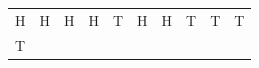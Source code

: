 {{\begin{center}
\begin{tabular}[t]{|l|l|l|l|l|l|l|l|l|l|}
     \tabularnewline\cline{1-1}\cline{2-2}\cline{3-3}\cline{4-4}\cline{5-5}\cline{6-6}\cline{7-7}\cline{8-8}\cline{9-9}\cline{10-10}
        H &
        H &
        H &
        H &
        T &
        H &
        H &
        T &
        T &
        T%
     \tabularnewline\cline{1-1}\cline{2-2}\cline{3-3}\cline{4-4}\cline{5-5}\cline{6-6}\cline{7-7}\cline{8-8}\cline{9-9}\cline{10-10}
        T &

\end{tabular}
\end{center}}}
